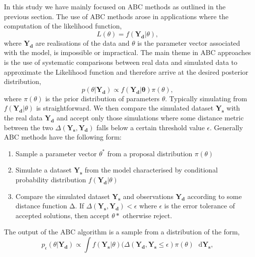 \documentclass[12pt,a4paper,titlepage]{article}
\begin{document}
In this study we have mainly focused on ABC methods as outlined in the previous section. The use of ABC methods arose in applications where the computation of the likelihood function,
\begin{equation*}
L(\theta) = f(\mathbf{Y_{d}} | \theta),
\end{equation*}
where $\mathbf{Y_{d}}$ are realisations of the data and $\theta$ is the parameter vector associated with the model, is impossible or impractical. The main theme in ABC approaches is the use of systematic comparisons between real data and simulated data to approximate the Likelihood function and therefore arrive at the desired posterior distribution,
\begin{equation*}
p(\theta|\mathbf{Y_{d}}) \propto f(\mathbf{Y_{d}|\theta})\pi(\theta),
\end{equation*}
where $\pi(\theta)$ is the prior distribution of parameters $\theta$. Typically simulating from $f(\mathbf{Y_{d}} | \theta)$ is straightforward. We then compare the simulated dataset $\mathbf{Y_{s}}$ with the real data $\mathbf{Y_{d}}$ and accept only those simulations where some distance metric between the two $\Delta(\mathbf{Y_{s}}, \mathbf{Y_{d}})$ falls below a certain threshold value $\epsilon$.  Generally ABC methods have the following form:\begin{enumerate}[noitemsep]
\item{Sample a parameter vector $\theta^*$ from a proposal distribution $\pi(\theta) $}
\item{Simulate a dataset $\mathbf{Y_{s}}$ from the model characterised by conditional probability distribution $f(\mathbf{Y_{d}}|\theta)$}
\item{Compare the simulated dataset $\mathbf{Y_{s}}$ and observations $\mathbf{Y_{d}}$ according to some distance function $\mathrm{\Delta}$. If $\Delta(\mathbf{Y_{s}}, \mathbf{Y_{d}}) < \epsilon$ where $\epsilon$ is the error tolerance of accepted solutions, then accept $\theta*$ otherwise reject. }
\end{enumerate}
The output of the ABC algorithm is a sample from a distribution of the form,
\begin{equation}
p_\epsilon(\theta|\mathbf{Y_{d}}) \propto \int f(\mathbf{Y_{s}}|\theta)  (\Delta(\mathbf{Y_{d}}, \mathbf{Y_{s}} \leq \epsilon) \pi(\theta)  \text{ }\mathrm{d}\mathbf{Y_{s}},
\end{equation}
\end{document}
